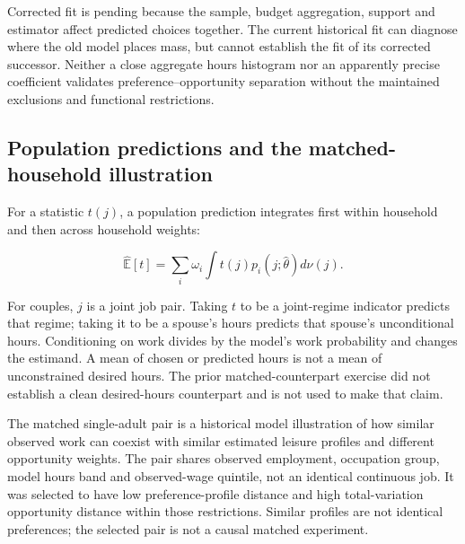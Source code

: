 \documentclass[11pt,a4paper]{article}
\begin{document}
Corrected fit is pending because the sample, budget aggregation, support and estimator affect predicted choices together. The current historical fit can diagnose where the old model places mass, but cannot establish the fit of its corrected successor. Neither a close aggregate hours histogram nor an apparently precise coefficient validates preference--opportunity separation without the maintained exclusions and functional restrictions.

\subsection{Population predictions and the matched-household illustration}\label{population-predictions-and-the-matched-household-illustration}

For a statistic \(t(j)\), a population prediction integrates first within household and then across household weights:

\[\widehat{\mathbb E}[t]=\sum_i\omega_i\int t(j)p_i(j;\widehat\theta)d\nu(j).\]

For couples, \(j\) is a joint job pair. Taking \(t\) to be a joint-regime indicator predicts that regime; taking it to be a spouse's hours predicts that spouse's unconditional hours. Conditioning on work divides by the model's work probability and changes the estimand. A mean of chosen or predicted hours is not a mean of unconstrained desired hours. The prior matched-counterpart exercise did not establish a clean desired-hours counterpart and is not used to make that claim.

The matched single-adult pair is a historical model illustration of how similar observed work can coexist with similar estimated leisure profiles and different opportunity weights. The pair shares observed employment, occupation group, model hours band and observed-wage quintile, not an identical continuous job. It was selected to have low preference-profile distance and high total-variation opportunity distance within those restrictions. Similar profiles are not identical preferences; the selected pair is not a causal matched experiment.
\end{document}
